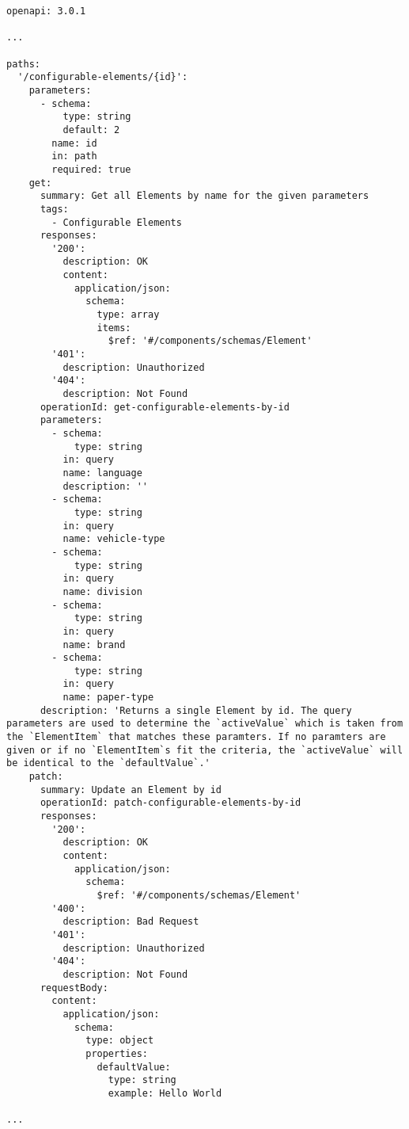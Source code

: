 \begin{lstlisting}
openapi: 3.0.1

...

paths:
  '/configurable-elements/{id}':
    parameters:
      - schema:
          type: string
          default: 2
        name: id
        in: path
        required: true
    get:
      summary: Get all Elements by name for the given parameters
      tags:
        - Configurable Elements
      responses:
        '200':
          description: OK
          content:
            application/json:
              schema:
                type: array
                items:
                  $ref: '#/components/schemas/Element'
        '401':
          description: Unauthorized
        '404':
          description: Not Found
      operationId: get-configurable-elements-by-id
      parameters:
        - schema:
            type: string
          in: query
          name: language
          description: ''
        - schema:
            type: string
          in: query
          name: vehicle-type
        - schema:
            type: string
          in: query
          name: division
        - schema:
            type: string
          in: query
          name: brand
        - schema:
            type: string
          in: query
          name: paper-type
      description: 'Returns a single Element by id. The query parameters are used to determine the `activeValue` which is taken from the `ElementItem` that matches these paramters. If no paramters are given or if no `ElementItem`s fit the criteria, the `activeValue` will be identical to the `defaultValue`.'
    patch:
      summary: Update an Element by id
      operationId: patch-configurable-elements-by-id
      responses:
        '200':
          description: OK
          content:
            application/json:
              schema:
                $ref: '#/components/schemas/Element'
        '400':
          description: Bad Request
        '401':
          description: Unauthorized
        '404':
          description: Not Found
      requestBody:
        content:
          application/json:
            schema:
              type: object
              properties:
                defaultValue:
                  type: string
                  example: Hello World

...


\end{lstlisting}
